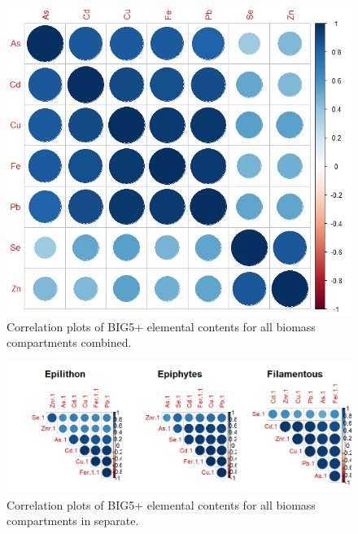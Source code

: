 \documentclass[
]{article}
\begin{document}
\begin{figure}
\includegraphics[width=1\linewidth]{Figures/CORRPLOT_1_BIG5PLUS} \caption[Correlation plots of BIG5+ elemental contents for all biomass compartments combined]{Correlation plots of BIG5+ elemental contents for all biomass compartments combined.}\label{fig:unnamed-chunk-8}
\end{figure}

\FloatBarrier

\begin{figure}
\includegraphics[width=1\linewidth]{Figures/CORRPLOT_1_BIG5_By_Compartment} \caption[Correlation plots of BIG5+ elemental contents for all biomass compartments in separate]{Correlation plots of BIG5+ elemental contents for all biomass compartments in separate.}\label{fig:unnamed-chunk-9}
\end{figure}

\FloatBarrier

\newpage
\end{document}
